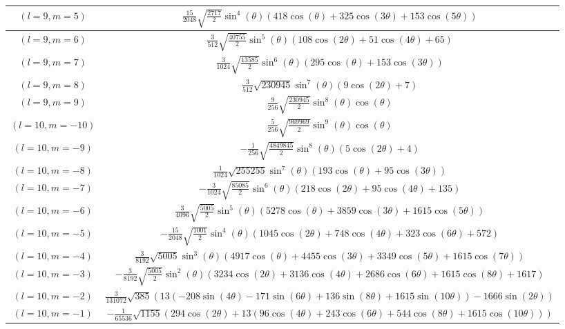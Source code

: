 \begin{center}
\begin{longtable}{|c|c|}
$(l=9, m=5)$ & $\frac{15}{2048} \sqrt{\frac{2717}{2}} \sin ^4(\theta ) (418 \cos (\theta )+325 \cos (3 \theta )+153 \cos (5 \theta ))$ \\ \hline
$(l=9, m=6)$ & $\frac{3}{512} \sqrt{\frac{40755}{2}} \sin ^5(\theta ) (108 \cos (2 \theta )+51 \cos (4 \theta )+65)$ \\ \hline
\rowcolor{gray!15}
$(l=9, m=7)$ & $\frac{3}{1024} \sqrt{\frac{13585}{2}} \sin ^6(\theta ) (295 \cos (\theta )+153 \cos (3 \theta ))$ \\ \hline
$(l=9, m=8)$ & $\frac{3}{512} \sqrt{230945} \sin ^7(\theta ) (9 \cos (2 \theta )+7)$ \\ \hline
\rowcolor{gray!15}
$(l=9, m=9)$ & $\frac{9}{256} \sqrt{\frac{230945}{2}} \sin ^8(\theta ) \cos (\theta )$ \\ \hline
$(l=10, m=-10)$ & $\frac{5}{256} \sqrt{\frac{969969}{2}} \sin ^9(\theta ) \cos (\theta )$ \\ \hline
\rowcolor{gray!15}
$(l=10, m=-9)$ & $-\frac{1}{256} \sqrt{\frac{4849845}{2}} \sin ^8(\theta ) (5 \cos (2 \theta )+4)$ \\ \hline
$(l=10, m=-8)$ & $\frac{1}{1024} \sqrt{255255} \sin ^7(\theta ) (193 \cos (\theta )+95 \cos (3 \theta ))$ \\ \hline
\rowcolor{gray!15}
$(l=10, m=-7)$ & $-\frac{3}{1024} \sqrt{\frac{85085}{2}} \sin ^6(\theta ) (218 \cos (2 \theta )+95 \cos (4 \theta )+135)$ \\ \hline
$(l=10, m=-6)$ & $\frac{3}{4096} \sqrt{\frac{5005}{2}} \sin ^5(\theta ) (5278 \cos (\theta )+3859 \cos (3 \theta )+1615 \cos (5 \theta ))$ \\ \hline
\rowcolor{gray!15}
$(l=10, m=-5)$ & $-\frac{15}{2048} \sqrt{\frac{1001}{2}} \sin ^4(\theta ) (1045 \cos (2 \theta )+748 \cos (4 \theta )+323 \cos (6 \theta )+572)$ \\ \hline
$(l=10, m=-4)$ & $\frac{3}{8192} \sqrt{5005} \sin ^3(\theta ) (4917 \cos (\theta )+4455 \cos (3 \theta )+3349 \cos (5 \theta )+1615 \cos (7 \theta ))$ \\ \hline
\rowcolor{gray!15}
$(l=10, m=-3)$ & $-\frac{3}{8192} \sqrt{\frac{5005}{2}} \sin ^2(\theta ) (3234 \cos (2 \theta )+3136 \cos (4 \theta )+2686 \cos (6 \theta )+1615 \cos (8 \theta )+1617)$ \\ \hline
$(l=10, m=-2)$ & $\frac{3}{131072} \sqrt{385} (13 (-208 \sin (4 \theta )-171 \sin (6 \theta )+136 \sin (8 \theta )+1615 \sin (10 \theta ))-1666 \sin (2 \theta ))$ \\ \hline
\rowcolor{gray!15}
$(l=10, m=-1)$ & $-\frac{1}{65536} \sqrt{1155} (294 \cos (2 \theta )+13 (96 \cos (4 \theta )+243 \cos (6 \theta )+544 \cos (8 \theta )+1615 \cos (10 \theta )))$ \\ \hline

\end{longtable}
\end{center}
